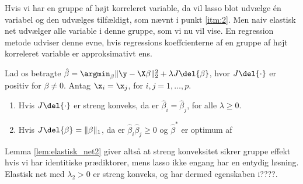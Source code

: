 %
Hvis vi har en gruppe af højt korreleret variable, da vil lasso blot udvælge én variabel og den udvælges tilfældigt, som nævnt i punkt \ref{itm:2}.
Men naiv elastisk net udvælger alle variable i denne gruppe, som vi nu vil vise. 
En regression metode udviser denne evne, hvis regressions koeffcienterne af en gruppe af højt korreleret variable er approksimativt ens.
%
\begin{lem} \label{lem:elastisk_net2}
Lad os betragte \(\hat{\beta} = \argmin_\beta \Vert \y - \X \beta \Vert_2^2 + \lambda J \del{\beta}\), hvor \(J \del{\cdot}\) er positiv for \(\beta \neq 0\).
Antag \(\x_i = \x_j\), for \(i, j = 1, \ldots, p\).
\begin{enumerate}[label=\alph*)]
\item Hvis \(J \del{\cdot}\) er streng konveks, da er \(\hat{\beta}_i = \hat{\beta}_j\), for alle \(\lambda \geq 0\).
\item Hvis \(J \del{\beta} = \Vert \beta \Vert_1\), da er \(\hat{\beta}_i \hat{\beta}_j \geq 0\) og \(\hat{\beta}^*\) er optimum af 
\end{enumerate}
\end{lem}
%
Lemma \ref{lem:elastisk_net2} giver altså at streng konveksitet sikrer gruppe effekt hvis vi har identitiske prædiktorer, mens lasso ikke engang har en entydig løsning.
Elastisk net med \(\lambda_2 > 0\) er streng konveks, og har dermed egenskaben i????.



